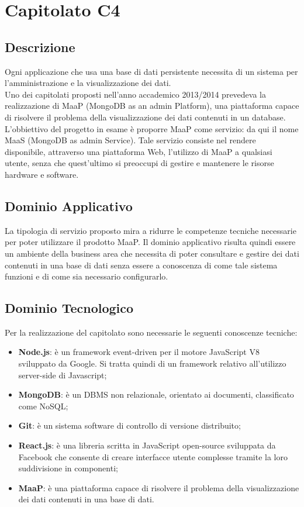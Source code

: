 \newpage
\section{Capitolato C4}
\subsection{Descrizione}
Ogni applicazione che usa una base di dati persistente necessita di un sistema per l'amministrazione e la visualizzazione dei dati.\\ Uno dei capitolati proposti nell'anno accademico 2013/2014 prevedeva la realizzazione di MaaP (MongoDB as an admin Platform), una piattaforma capace di risolvere il problema della visualizzazione dei dati contenuti in un database.\\ 
L'obbiettivo del progetto in esame è proporre MaaP come servizio: da qui il nome MaaS (MongoDB as admin Service). Tale servizio consiste nel rendere disponibile, attraverso una piattaforma Web, l'utilizzo di MaaP a qualsiasi utente, senza che quest'ultimo si preoccupi di gestire e mantenere le risorse hardware e software. 

\subsection{Dominio Applicativo}
La tipologia di servizio proposto mira a ridurre le competenze tecniche necessarie per poter utilizzare il prodotto MaaP. Il dominio applicativo risulta quindi essere un ambiente della business area che necessita di poter consultare e gestire dei dati contenuti in una base di dati senza essere a conoscenza di come tale sistema funzioni e di come sia necessario configurarlo. 

\subsection{Dominio Tecnologico}
Per la realizzazione del capitolato sono necessarie le seguenti conoscenze tecniche:
\begin{itemize}
	\item \textbf{Node.js}: è un framework event-driven per il motore JavaScript V8 sviluppato da Google. Si tratta quindi di un framework relativo all'utilizzo server-side di Javascript; 
	\item \textbf{MongoDB}: è un DBMS non relazionale, orientato ai documenti, classificato come NoSQL;
	\item \textbf{Git}: è un sistema software di controllo di versione distribuito; 
	\item \textbf{React.js}: è una libreria scritta in JavaScript open-source sviluppata da Facebook che consente di creare interfacce utente complesse tramite la loro suddivisione in componenti; 
	\item \textbf{MaaP}: è una piattaforma capace di risolvere il problema della visualizzazione dei dati contenuti in una base di dati.	
\end{itemize}

